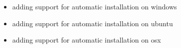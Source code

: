 \documentclass[a4paper,10pt,english]{sphinxmanual}
\begin{document}
\begin{itemize}
\item {} 
\sphinxAtStartPar
adding support for automatic installation on windows

\item {} 
\sphinxAtStartPar
adding support for automatic installation on ubuntu

\item {} 
\sphinxAtStartPar
adding support for automatic installation on osx

\end{itemize}



\renewcommand{\indexname}{Index}
\printindex
\end{document}
